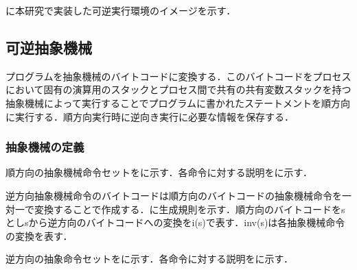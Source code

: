 \documentclass[submit,PRO]{ipsj}
\begin{document}
に本研究で実装した可逆実行環境のイメージを示す．



\subsection{可逆抽象機械}
\label{sec:format}

プログラムを抽象機械のバイトコードに変換する．このバイトコードをプロセスにおいて固有の演算用のスタックとプロセス間で共有の共有変数スタックを持つ抽象機械によって実行することでプログラムに書かれたステートメントを順方向に実行する．順方向実行時に逆向き実行に必要な情報を保存する．




\subsubsection{抽象機械の定義}

順方向の抽象機械命令セットをに示す．各命令に対する説明をに示す．

逆方向抽象機械命令のバイトコードは順方向のバイトコードの抽象機械命令を一対一で変換することで作成する．に生成規則を示す．順方向のバイトコードをsとしsから逆方向のバイトコードへの変換をi(s)で表す．inv(s)は各抽象機械命令の変換を表す．

逆方向の抽象命令セットをに示す．各命令に対する説明をに示す．
\end{document}
